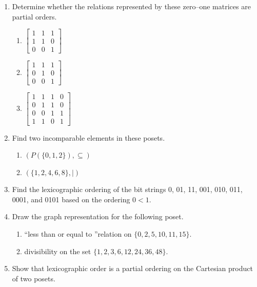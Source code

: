 \documentclass{sig-alternate-05-2015}
\begin{document}
\begin{enumerate}
\item Determine whether the relations represented by these
zero–one matrices are partial orders.
\begin{enumerate}
	\item 
	$\begin{bmatrix}
		1 & 1 & 1\\
		1 & 1 & 0\\
		0 & 0 & 1
	\end{bmatrix}$
	\item 
	$\begin{bmatrix}
		1 & 1 & 1\\
		0 & 1 & 0\\
		0 & 0 & 1
	\end{bmatrix}$
	\item 
	$\begin{bmatrix}
		1 & 1 & 1 & 0\\
		0 & 1 & 1 & 0\\
		0 & 0 & 1 & 1\\
		1 & 1 & 0 & 1
	\end{bmatrix}$
\end{enumerate}

\item Find two incomparable elements in these posets.
\begin{enumerate}
	\item $(P(\{0, 1, 2\}), \subseteq)$
	\item $(\{1, 2, 4, 6, 8\}, |)$
\end{enumerate}

\item Find the lexicographic ordering of the bit strings 0, 01,
11, 001, 010, 011, 0001, and 0101 based on the ordering
$0 < 1$.

\item Draw the graph representation for the following poset.
	\begin{enumerate}
		\item \textquotedblleft less than or equal to \textquotedblright relation on $\{0, 2, 5, 10, 11, 15\}.$
		\item divisibility on the set $\{1, 2, 3, 6, 12, 24, 36, 48\}$.
	\end{enumerate}

\item Show that lexicographic order is a partial ordering on the
Cartesian product of two posets.


\end{enumerate}
\end{document}
